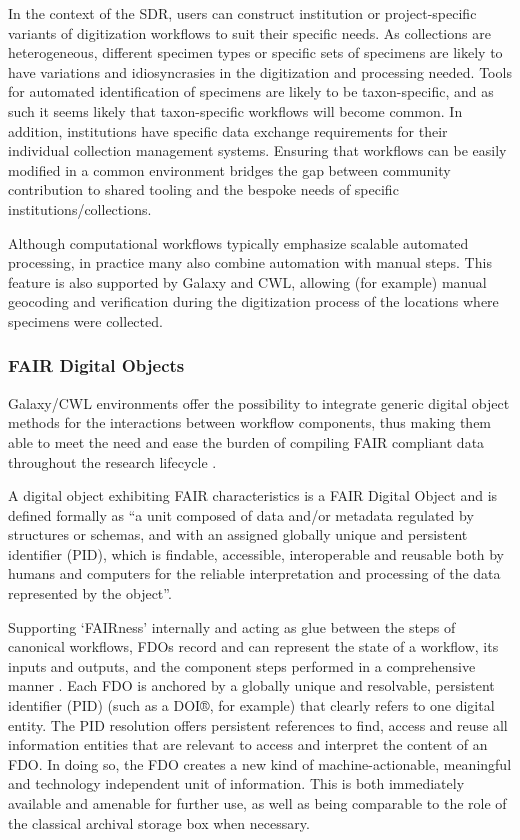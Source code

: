 In the context of the SDR, users can construct institution or
project-specific variants of digitization workflows to suit their
specific needs. As collections are heterogeneous, different specimen
types or specific sets of specimens are likely to have variations and
idiosyncrasies in the digitization and processing needed. Tools for
automated identification of specimens are likely to be taxon-specific,
and as such it seems likely that taxon-specific workflows will become
common. In addition, institutions have specific data exchange
requirements for their individual collection management systems.
Ensuring that workflows can be easily modified in a common environment
bridges the gap between community contribution to shared tooling and the
bespoke needs of specific institutions/collections.

Although computational workflows typically emphasize scalable automated
processing, in practice many also combine automation with manual steps.
This feature is also supported by Galaxy and CWL, allowing (for example)
manual geocoding and verification during the digitization process of the
locations where specimens were collected.

\subsubsection{FAIR Digital Objects}\label{fair-digital-objects-1}

Galaxy/CWL environments offer the possibility to integrate generic
digital object methods \cite{ch8-44,ch8-45,Kahn 2006} for the interactions between
workflow components, thus making them able to meet the need and ease the
burden of compiling FAIR compliant data throughout the research
lifecycle \cite{ch8-27}.

A digital object exhibiting FAIR characteristics is a FAIR Digital
Object \cite{De Smedt 2020} and is defined formally as ``a unit composed of data
and/or metadata regulated by structures or schemas, and with an assigned
globally unique and persistent identifier (PID), which is findable,
accessible, interoperable and reusable both by humans and computers for
the reliable interpretation and processing of the data represented by
the object''.

Supporting `FAIRness' internally and acting as glue between the steps of
canonical workflows, FDOs record and can represent the state of a
workflow, its inputs and outputs, and the component steps performed in a
comprehensive manner \cite{ch8-27}. Each FDO is anchored by a globally unique
and resolvable, persistent identifier (PID) (such as a DOI®, for
example) that clearly refers to one digital entity. The PID resolution
offers persistent references to find, access and reuse all information
entities that are relevant to access and interpret the content of an
FDO. In doing so, the FDO creates a new kind of machine-actionable,
meaningful and technology independent unit of information. This is both
immediately available and amenable for further use, as well as being
comparable to the role of the classical archival storage box when
necessary.

